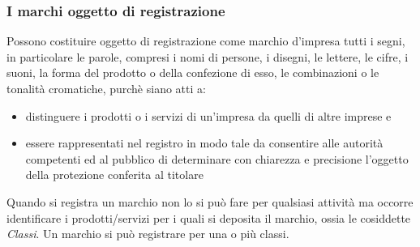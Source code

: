 \subsubsection{I marchi oggetto di registrazione}
Possono costituire oggetto di registrazione come marchio d'impresa tutti i segni, in particolare le parole, compresi i nomi di persone,
i disegni, le lettere, le cifre, i suoni, la forma del prodotto o della confezione di esso, le combinazioni o le tonalità cromatiche, purchè siano atti a:
\begin{itemize}
    \item distinguere i prodotti o i servizi di un'impresa da quelli di altre imprese e
    \item essere rappresentati nel registro in modo tale da consentire alle autorità competenti ed al pubblico di determinare con chiarezza e precisione l'oggetto della
    protezione conferita al titolare
\end{itemize}
Quando si registra un marchio non lo si può fare per qualsiasi attività ma occorre identificare i prodotti/servizi per i quali si deposita il marchio, ossia
le cosiddette \emph{Classi}. Un marchio si può registrare per una o più classi.

